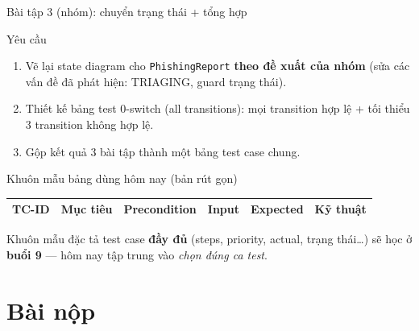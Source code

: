 \documentclass[aspectratio=169,12pt]{beamer}
\begin{document}
\begin{frame}[shrink=6]{Bài tập 3 (nhóm): chuyển trạng thái + tổng hợp}
  \begin{block}{Yêu cầu}
    \small
    \begin{enumerate}
      \item Vẽ lại state diagram cho \texttt{PhishingReport} \textbf{theo đề xuất
        của nhóm} (sửa các vấn đề đã phát hiện: TRIAGING, guard trạng thái).
      \item Thiết kế bảng test 0-switch (all transitions): mọi transition
        hợp lệ + tối thiểu 3 transition không hợp lệ.
      \item Gộp kết quả 3 bài tập thành một bảng test case chung.
    \end{enumerate}
  \end{block}

  \vspace{0.2em}
  \begin{exampleblock}{Khuôn mẫu bảng dùng hôm nay (bản rút gọn)}
    \small
    \begin{center}
    \begin{tabular}{llllll}
      \toprule
      TC-ID & Mục tiêu & Precondition & Input & Expected & Kỹ thuật \\
      \bottomrule
    \end{tabular}
    \end{center}
    Khuôn mẫu đặc tả test case \textbf{đầy đủ} (steps, priority, actual,
    trạng thái\ldots) sẽ học ở \textbf{buổi 9} --- hôm nay tập trung vào
    \textit{chọn đúng ca test}.
  \end{exampleblock}
\end{frame}

\section{Bài nộp}
\end{document}
